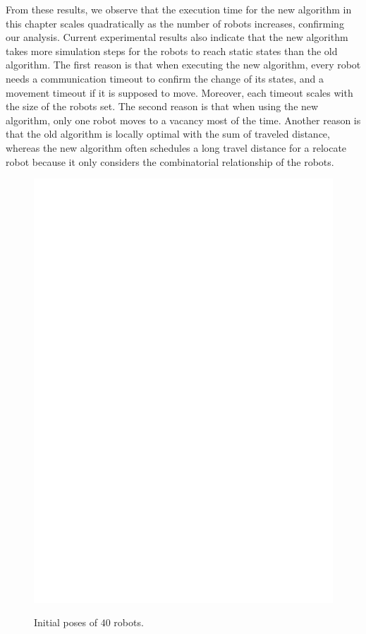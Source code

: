 From these results, we observe that the execution time for the new
algorithm in this chapter scales quadratically as the number of robots increases,
confirming our analysis.  
  Current experimental results also indicate that
  the new algorithm takes more simulation steps for the robots to reach
  static states than the old algorithm. 
  The first reason is that when
  executing the new algorithm, every robot needs a communication timeout
  to confirm the change of its states, and a movement timeout if it is
  supposed to move. 
  Moreover, each timeout scales with the size of the
  robots set. 
  The second reason is that when using the new algorithm,
  only one robot moves to a vacancy most of the time. 
  Another reason is
  that the old algorithm is locally optimal with the sum of traveled
  distance, whereas the new algorithm often schedules a long travel distance for a relocate robot because it only considers the combinatorial
  relationship of the robots.
  \begin{figure}
    \centering   
    \includegraphics[scale=0.45]{figs/initSnapshot}
    \label{fig:init40}
    \caption{Initial poses of $40$ robots.}
  \end{figure}
